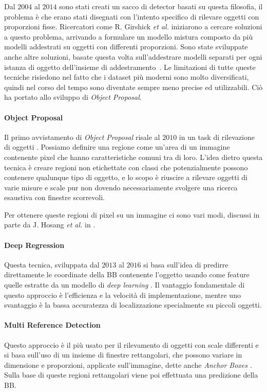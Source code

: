 Dal $2004$ al $2014$ sono stati creati un sacco di detector basati su questa filosofia, il problema è che erano stati disegnati con l'intento specifico di rilevare oggetti con proporzioni fisse. Ricercatori come R. Girshick \textit{et al.} iniziarono a cercare soluzioni a questo problema, arrivando a formulare un modello mistura \cite{felzenszwalb2009object} composto da più modelli addestrati su oggetti con differenti proporzioni. Sono state sviluppate anche altre soluzioni, basate questa volta sull'addestrare modelli separati per ogni istanza di oggetto dell'insieme di addestramento \cite{malisiewicz2011ensemble, malisiewicz2011exemplar}. Le limitazioni di tutte queste tecniche risiedono nel fatto che i dataset più moderni sono molto diversificati, quindi nel corso del tempo sono diventate sempre meno precise ed utilizzabili. Ciò ha portato allo sviluppo di \textit{Object Proposal}.
\paragraph{Object Proposal}
Il primo avvistamento di \textit{Object Proposal} risale al $2010$ in un task di rilevazione di oggetti \cite{alexe2010object}.
Possiamo definire una regione come un'area di un immagine contenente pixel che hanno caratteristiche comuni tra di loro. L'idea dietro questa tecnica è creare regioni non etichettate con classi che potenzialmente possono contenere qualunque tipo di oggetto, e lo scopo è riuscire a rilevare oggetti di varie misure e scale pur non dovendo necessariamente svolgere una ricerca esaustiva con finestre scorrevoli.

Per ottenere queste regioni di pixel su un immagine ci sono vari modi, discussi in parte da J. Hosang \textit{et al.} in \cite{hosang2015makes}.
\paragraph{Deep Regression}
Questa tecnica, sviluppata dal $2013$ al $2016$ si basa sull'idea di predirre direttamente le coordinate della \ac{BB} contenente l'oggetto usando come feature quelle estratte da un modello di \textit{deep learning} \cite{redmon2016you}. Il vantaggio fondamentale di questo approccio è l'efficienza e la velocità di implementazione, mentre uno svantaggio è la bassa accuratezza di localizzazione specialmente su piccoli oggetti.
\paragraph{Multi Reference Detection}
Questo approccio è il più usato per il rilevamento di oggetti con scale differenti e si basa sull'uso di un insieme di finestre rettangolari, che possono variare in dimensione e proporzioni, applicate sull'immagine, dette anche \textit{Anchor Boxes} \cite{ren2015faster, liu2016ssd, redmon2017yolo9000}. Sulla base di queste regioni rettangolari viene poi effettuata una predizione della \ac{BB}. 
